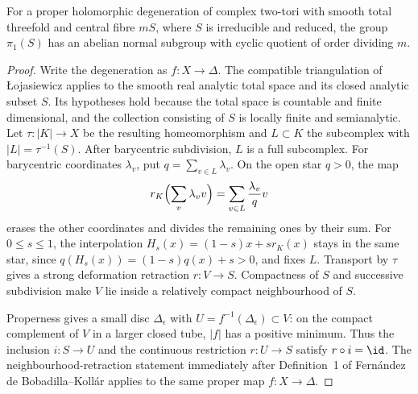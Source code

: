 \begin{proposition}\hypertarget{tag-02Y2}{}\label{night:P4R.1}\label{stmt:P4R.1}

For a proper holomorphic degeneration of complex two-tori with
smooth total threefold and central fibre $mS$, where $S$ is
irreducible and reduced, the group $\pi_1(S)$ has an abelian
normal subgroup with cyclic quotient of order dividing $m$.
\end{proposition}
\begin{proof}
Write the degeneration as $f:X\to\Delta$.
The compatible triangulation of {\L}ojasiewicz
\cite[Theorem~2, p.~464]{Lojasiewicz1964} applies to
the smooth real analytic total space and its closed analytic
subset $S$. Its hypotheses hold because the total space is
countable and finite dimensional, and the collection consisting
of $S$ is locally finite and semianalytic. Let $\tau:|K|\to X$ be the resulting homeomorphism and
$L\subset K$ the subcomplex with $|L|=\tau^{-1}(S)$.
After barycentric subdivision, $L$ is a full subcomplex.
For barycentric coordinates $\lambda_v$, put
$q=\sum_{v\in L}\lambda_v$. On the open star $q>0$, the map
\[
 r_K\Bigl(\sum_v\lambda_v v\Bigr)
   =\sum_{v\in L}\frac{\lambda_v}{q}v
\]
erases the other coordinates and divides the remaining ones
by their sum. For $0\le s\le1$, the interpolation
$H_s(x)=(1-s)x+s r_K(x)$ stays in the same star, since
$q(H_s(x))=(1-s)q(x)+s>0$, and fixes $L$.
Transport by $\tau$ gives a strong deformation
retraction $r:V\to S$. Compactness of $S$ and successive
subdivision make $V$ lie inside a relatively compact
neighbourhood of $S$.

Properness gives a small disc $\Delta_\epsilon$ with
$U=f^{-1}(\Delta_\epsilon)\subset V$: on the compact
complement of $V$ in a larger closed tube, $|f|$ has a
positive minimum. Thus the inclusion $i:S\to U$ and the
continuous restriction $r:U\to S$ satisfy $r\circ i=\id$.
The neighbourhood-retraction statement immediately after
Definition~1 of Fern\'andez de Bobadilla--Koll\'ar
\cite[p.~85]{BobadillaKollar2012} applies to the same proper
map $f:X\to\Delta$.


\end{proof}
